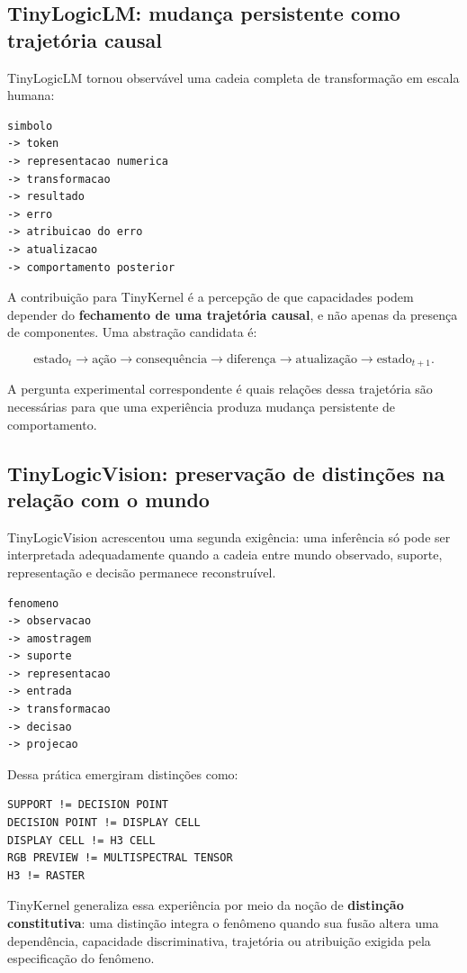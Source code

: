 \documentclass[11pt,a4paper]{article}
\begin{document}
\subsection{TinyLogicLM: mudança persistente como trajetória causal}

TinyLogicLM tornou observável uma cadeia completa de transformação em escala humana:

\begin{lstlisting}
simbolo
-> token
-> representacao numerica
-> transformacao
-> resultado
-> erro
-> atribuicao do erro
-> atualizacao
-> comportamento posterior
\end{lstlisting}

A contribuição para TinyKernel é a percepção de que capacidades podem depender do
\textbf{fechamento de uma trajetória causal}, e não apenas da presença de componentes.
Uma abstração candidata é:

\[
\text{estado}_t
\rightarrow
\text{ação}
\rightarrow
\text{consequência}
\rightarrow
\text{diferença}
\rightarrow
\text{atualização}
\rightarrow
\text{estado}_{t+1}.
\]

A pergunta experimental correspondente é quais relações dessa trajetória são
necessárias para que uma experiência produza mudança persistente de comportamento.

\subsection{TinyLogicVision: preservação de distinções na relação com o mundo}

TinyLogicVision acrescentou uma segunda exigência: uma inferência só pode ser
interpretada adequadamente quando a cadeia entre mundo observado, suporte,
representação e decisão permanece reconstruível.

\begin{lstlisting}
fenomeno
-> observacao
-> amostragem
-> suporte
-> representacao
-> entrada
-> transformacao
-> decisao
-> projecao
\end{lstlisting}

Dessa prática emergiram distinções como:

\begin{lstlisting}
SUPPORT != DECISION POINT
DECISION POINT != DISPLAY CELL
DISPLAY CELL != H3 CELL
RGB PREVIEW != MULTISPECTRAL TENSOR
H3 != RASTER
\end{lstlisting}

TinyKernel generaliza essa experiência por meio da noção de
\textbf{distinção constitutiva}: uma distinção integra o fenômeno quando sua fusão
altera uma dependência, capacidade discriminativa, trajetória ou atribuição exigida
pela especificação do fenômeno.
\end{document}
